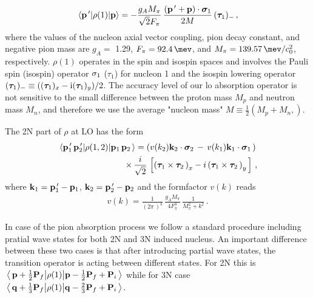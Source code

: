     \begin{eqnarray}
        \matrixel{{\bf p}^{\, \prime}} 
        {\rho(1)} {{\bf p}} = 
        - \frac{g_A M_\pi}{\sqrt{2} F_\pi } \,
            \frac{ \left( {\bf p}^{\, \prime} +  {\bf p} \right) \cdot {\bm \sigma}_1 } { 2 M } \, 
            ({\bm \tau}_{1})_- \, ,
    \label{rho1}
    \end{eqnarray}
    where the values of the nucleon axial vector coupling, pion decay constant, and negative pion mass are $g_A =$ 1.29, 
    $F_\pi = \SI{92.4}{\mev}$, and $M_\pi = \SI{139.57}{\mev \per \clight\squared}$, respectively. $\rho (1)$ operates in the spin
    and isospin spaces and involves the Pauli spin (isospin) operator ${\bf \sigma}_1$ ($\tau_1$) for nucleon 1 and the isospin lowering operator
    $({\bm \tau}_{1})_- \equiv(({\bm \tau}_1)_x -{\rm i} ({\bm \tau}_1)_y)/2$.
    The accuracy level of our \gls{lo} absorption operator is not sensitive to 
    the small difference between the
    proton mass $M_p$ and neutron mass $M_n$, and therefore we use the average 
    "nucleon mass" $M \equiv \frac12 \left( M_p + M_n , \right)$.



    The 2N part of $ \rho$ at LO has the form \cite{Lensky2006}
    \begin{eqnarray}
    \matrixel{
        {\bf p}_1^{\, \prime}\,
        {\bf p}_2^{\, \prime}
        } 
    {\rho(1,2)}
    {
        {\bf p}_1 \, 
        {\bf p}_2 \, 
        } = 
        \left(
        v( k_2 )  {\bf k}_2 \cdot {\bm \sigma}_2 \, - \, 
        v( k_1 )  {\bf k}_1 \cdot {\bm \sigma}_1 \,
        \right) \, \nonumber \\ \times \,
        \frac{i}{\sqrt{2}} \, 
        \left[ 
            \left( {\bm \tau}_1 \times {\bm \tau}_2 \, \right)_x 
            - i \left( {\bm \tau}_1 \times {\bm \tau}_2 \, \right)_y \,
        \right] \,,
    \label{rho12}
    \end{eqnarray}
    where 
    $ {\bf k}_1 = {\bf p}_1^{\, \prime} - {\bf p}_1 $,
    $ {\bf k}_2 = {\bf p}_2^{\, \prime} - {\bf p}_2 $
    and the formfactor $v(k)$ reads 
    \begin{eqnarray}
    v (k) = \frac 1{ \left( 2 \pi \, \right)^3 } \,
            \frac{g_A M_\pi}{4 F_\pi^3 } \,
        \frac1{M_\pi^2 + k^2 } \, .
    \label{vk}
    \end{eqnarray}

    In case of the pion absorption process we follow a standard procedure
    including pratial wave states for both 2N and 3N induced nucleus.
    An important difference between these two cases is that
    after introducing partial wave states, the transition operator is acting between
    different states. For 2N this is 
    $ \matrixel{\, {\bf p} + \frac12{\bf P}_f } 
    {\rho (1) }{ {\bf p} - \frac12{\bf P}_f + {\bf P}_i \, }$
    while for 3N case
    $\matrixel {\, {\bf q} + \frac13{\bf P}_f}  
    {\rho(1)} {{\bf q} - \frac23{\bf P}_f + {\bf P}_i \,}$.

